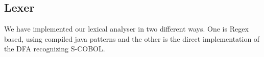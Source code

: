 \subsection{Lexer}
We have implemented our lexical analyser in two different ways. One is Regex based, using compiled java patterns and the other is the direct implementation of the DFA recognizing S-COBOL.